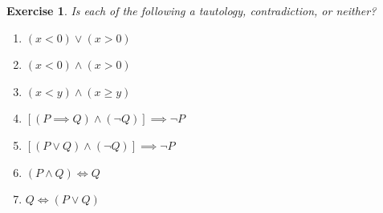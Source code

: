 \documentclass{article}[12pt]
\newtheorem{exercise}{Exercise}[section]
\begin{document}
        \begin{exercise}
            Is each of the following a tautology, contradiction, or neither?
            \begin{multicols}{2}
                \begin{enumerate}
                    \item
                    $(x < 0) \lor (x > 0)$
                    
                    \item
                    $(x < 0) \land (x > 0)$
                    
                    \item
                    $(x < y) \land (x \ge y)$
                    
                    \item
                    $[(P \implies Q) \land (\neg Q)] \implies  \neg P$
                    
                    \item
                    $[(P \lor Q) \land (\neg Q)] \implies  \neg P$
                    
                    \item
                    $(P \land Q) \iff Q$
                    
                    \item
                    $Q \iff (P \lor Q)$
                    
                \end{enumerate}
            \end{multicols}
            
        \end{exercise}
        
\end{document}
